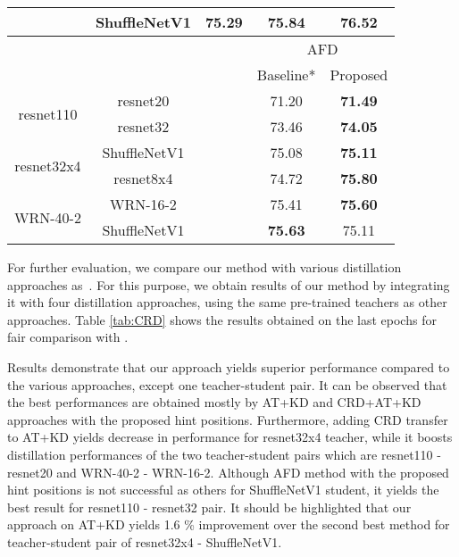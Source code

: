 \documentclass[final,3p,times]{elsarticle}
\begin{document}
\begin{table}[]
\begin{center}
\begin{tabular}{c|c|c|c|c}
                            & ShuffleNetV1            & {75.29} & 75.84              & \textbf{76.52}     \\ \hline \hline 
\multicolumn{1}{l}{}        & \multicolumn{1}{l}{} &    & \multicolumn{2}{c}{AFD}    \\ \cline{4-5}
\multicolumn{1}{l}{}        & \multicolumn{1}{l}{} && {Baseline*}                    & Proposed            \\ \hline
\multirow{2}{*}{resnet110}  & resnet20             & &{71.20}                       & \textbf{71.49}     \\
& resnet32          &   & {73.46}               & \textbf{74.05}     \\ \hline
\multirow{2}{*}{resnet32x4} & ShuffleNetV1         & &{75.08}                       & \textbf{75.11}     \\
& resnet8x4   & &{74.72}        & \textbf{75.80}     \\ \hline
\multirow{2}{*}{WRN-40-2}   & WRN-16-2             & &{75.41}                       & \textbf{75.60}     \\
& ShuffleNetV1  & &{\textbf{75.63}}              & 75.11             \\ \hline
\end{tabular}
\label{tab:AFD_WSL}
\end{center}
\end{table}

For further evaluation, we compare our method with various distillation approaches as~\citep{tian2019contrastive}. For this purpose, we obtain results of our method by integrating it with four distillation approaches, using the same pre-trained teachers as other approaches. Table \ref{tab:CRD} shows the results obtained on the last epochs for fair comparison with \citep{tian2019contrastive}.

Results demonstrate that our approach yields superior performance compared to the various approaches, except one teacher-student pair. It can be observed that the best performances are obtained mostly by AT+KD and CRD+AT+KD approaches with the proposed hint positions. Furthermore, adding CRD transfer to AT+KD yields decrease in performance for resnet32x4 teacher, while it boosts distillation performances of the two teacher-student pairs which are resnet110 - resnet20 and WRN-40-2 - WRN-16-2. Although AFD method with the proposed hint positions is not successful as others for ShuffleNetV1 student, it yields the best result for resnet110 - resnet32 pair. It should be highlighted that our approach on AT+KD yields 1.6 \% improvement over the second best method for teacher-student pair of resnet32x4 - ShuffleNetV1.
\end{document}
